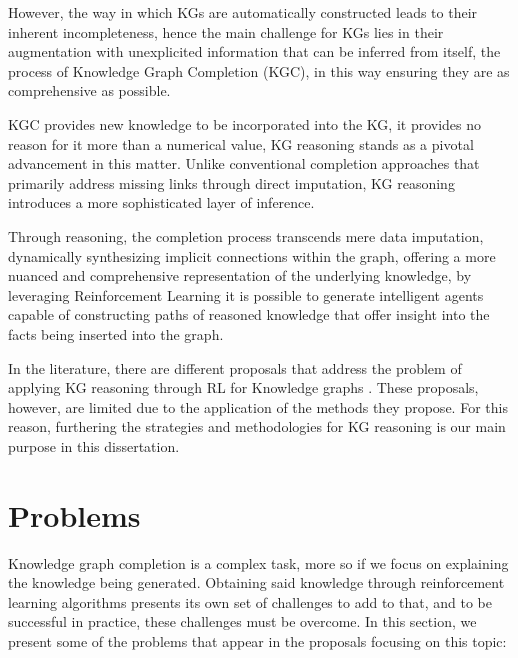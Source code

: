 However, the way in which KGs are automatically constructed leads to their inherent incompleteness, hence the main challenge for KGs lies in their augmentation with unexplicited information that can be inferred from itself, the process of Knowledge Graph Completion (KGC), in this way ensuring they are as comprehensive as possible.

KGC provides new knowledge to be incorporated into the KG, it provides no reason for it more than a numerical value, KG reasoning stands as a pivotal advancement in this matter. Unlike conventional completion approaches that primarily address missing links through direct imputation, KG reasoning introduces a more sophisticated layer of inference.

Through reasoning, the completion process transcends mere data imputation, dynamically synthesizing implicit connections within the graph, offering a more nuanced and comprehensive representation of the underlying knowledge, by leveraging Reinforcement Learning it is possible to generate intelligent agents capable of constructing paths of reasoned knowledge that offer insight into the facts being inserted into the graph.

In the literature, there are different proposals that address the problem of applying KG reasoning through RL for Knowledge graphs \cite{}. These proposals, however, are limited due to the application of the methods they propose. For this reason, furthering the strategies and methodologies for KG reasoning is our main purpose in this dissertation.

\section{Problems}\label{sec:moti-problems}
Knowledge graph completion is a complex task, more so if we focus on explaining the knowledge being generated. Obtaining said knowledge through reinforcement learning algorithms presents its own set of challenges to add to that, and to be successful in practice, these challenges must be overcome. In this section, we present some of the problems that appear in the proposals focusing on this topic:

